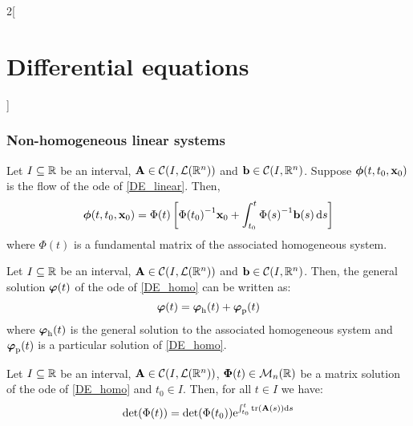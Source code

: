 \documentclass[../../../main.tex]{subfiles}
\begin{document}
\begin{multicols}{2}[\section{Differential equations}]
  \subsubsection{Non-homogeneous linear systems}
  \begin{proposition}
    Let $I\subseteq \mathbb{R}$ be an interval, $\boldsymbol{\mathrm{A}}\in\mathcal{C}(I,\mathcal{L}(\mathbb{R}^n))$ and $\boldsymbol{\mathrm{b}}\in\mathcal{C}(I,\mathbb{R}^n)$. Suppose $\boldsymbol{\mathrm{\phi}}(t,t_0,\boldsymbol{\mathrm{x}}_0)$ is the flow of the ode of \cref{DE_linear}. Then, $$\boldsymbol{\mathrm{\phi}}(t,t_0,\boldsymbol{\mathrm{x}}_0)=\Phi(t)\left[{\Phi(t_0)}^{-1}\boldsymbol{\mathrm{x}}_0+\int_{t_0}^t{\Phi(s)}^{-1}\boldsymbol{\mathrm{b}}(s)\dd{s}\right]$$ where $\Phi(t)$ is a fundamental matrix of the associated homogeneous system.
  \end{proposition}
  \begin{corollary}
    Let $I\subseteq \mathbb{R}$ be an interval, $\boldsymbol{\mathrm{A}}\in\mathcal{C}(I,\mathcal{L}(\mathbb{R}^n))$ and $\boldsymbol{\mathrm{b}}\in\mathcal{C}(I,\mathbb{R}^n)$. Then, the general solution $\boldsymbol{\mathrm{\varphi}}(t)$ of the ode of \cref{DE_homo} can be written as: $$\boldsymbol{\mathrm{\varphi}}(t)=\boldsymbol{\mathrm{\varphi}}_\mathrm{h}(t)+\boldsymbol{\mathrm{\varphi}}_\mathrm{p}(t)$$ where $\boldsymbol{\mathrm{\varphi}}_\mathrm{h}(t)$ is the general solution to the associated homogeneous system and $\boldsymbol{\mathrm{\varphi}}_\mathrm{p}(t)$ is a particular solution of \cref{DE_homo}.
  \end{corollary}
  \begin{proposition}
    Let $I\subseteq \mathbb{R}$ be an interval, $\boldsymbol{\mathrm{A}}\in\mathcal{C}(I,\mathcal{L}(\mathbb{R}^n))$, $\boldsymbol{\mathrm{\Phi}}(t)\in\mathcal{M}_n(\mathbb{R})$ be a matrix solution of the ode of \cref{DE_homo} and $t_0\in I$. Then, for all $t\in I$ we have: $$\det(\Phi(t))=\det (\Phi(t_0))\exp{\int_{t_0}^t\trace(\vf{A}(s))\dd{s}}$$
  \end{proposition}

\end{multicols}
\end{document}
